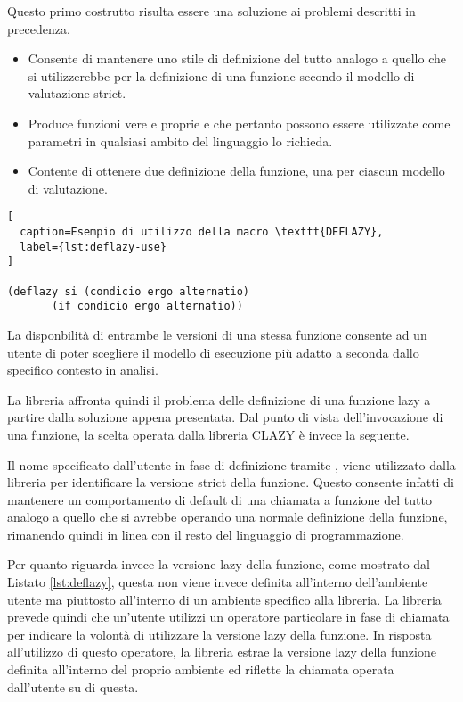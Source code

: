 Questo primo costrutto risulta essere una soluzione ai problemi descritti in precedenza.

\begin{itemize}

\item Consente di mantenere uno stile di definizione del tutto analogo a quello che si utilizzerebbe per la definizione di una funzione secondo il modello di valutazione strict.

\item Produce funzioni vere e proprie e che pertanto possono essere utilizzate come parametri in qualsiasi ambito del linguaggio lo richieda.

\item Contente di ottenere due definizione della funzione, una per ciascun modello di valutazione.

\end{itemize}

\begin{lstlisting}[
  caption=Esempio di utilizzo della macro \texttt{DEFLAZY},
  label={lst:deflazy-use}
]

(deflazy si (condicio ergo alternatio)
       (if condicio ergo alternatio))

\end{lstlisting}

La disponbilità di entrambe le versioni di una stessa funzione consente ad un utente di poter scegliere il modello di esecuzione più adatto a seconda dallo specifico contesto in analisi.

La libreria affronta quindi il problema delle definizione di una funzione lazy a partire dalla soluzione appena presentata. Dal punto di vista dell'invocazione di una funzione, la scelta operata dalla libreria CLAZY è invece la seguente.

Il nome specificato dall'utente in fase di definizione tramite , viene utilizzato dalla libreria per identificare la versione strict della funzione. Questo consente infatti di mantenere un comportamento di default di una chiamata a funzione del tutto analogo a quello che si avrebbe operando una normale definizione della funzione, rimanendo quindi in linea con il resto del linguaggio di programmazione.

Per quanto riguarda invece la versione lazy della funzione, come mostrato dal Listato \ref{lst:deflazy}, questa non viene invece definita all'interno dell'ambiente utente ma piuttosto all'interno di un ambiente specifico alla libreria. La libreria prevede quindi che un'utente utilizzi un operatore particolare in fase di chiamata per indicare la volontà di utilizzare la versione lazy della funzione. In risposta all'utilizzo di questo operatore, la libreria estrae la versione lazy della funzione definita all'interno del proprio ambiente ed riflette la chiamata operata dall'utente su di questa.

